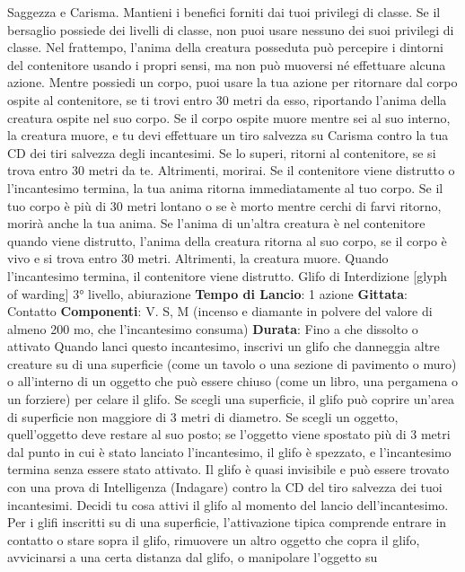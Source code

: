\begin{multicols}{2}
Saggezza e Carisma. Mantieni i benefici forniti dai tuoi
privilegi di classe. Se il bersaglio possiede dei livelli di
classe, non puoi usare nessuno dei suoi privilegi di
classe.
Nel frattempo, l’anima della creatura posseduta può
percepire i dintorni del contenitore usando i propri
sensi, ma non può muoversi né effettuare alcuna
azione.
Mentre possiedi un corpo, puoi usare la tua azione per
ritornare dal corpo ospite al contenitore, se ti trovi entro
30 metri da esso, riportando l’anima della creatura
ospite nel suo corpo. Se il corpo ospite muore mentre
sei al suo interno, la creatura muore, e tu devi effettuare
un tiro salvezza su Carisma contro la tua CD dei tiri
salvezza degli incantesimi. Se lo superi, ritorni al
contenitore, se si trova entro 30 metri da te. Altrimenti,
morirai.
Se il contenitore viene distrutto o l’incantesimo termina,
la tua anima ritorna immediatamente al tuo corpo. Se il
tuo corpo è più di 30 metri lontano o se è morto mentre
cerchi di farvi ritorno, morirà anche la tua anima. Se
l’anima di un’altra creatura è nel contenitore quando
viene distrutto, l’anima della creatura ritorna al suo
corpo, se il corpo è vivo e si trova entro 30 metri.
Altrimenti, la creatura muore.
Quando l’incantesimo termina, il contenitore viene
distrutto.
Glifo di Interdizione
[glyph of warding]
3° livello, abiurazione
\textbf{Tempo di Lancio}: 1 azione
\textbf{Gittata}: Contatto
\textbf{Componenti}: V. S, M (incenso e diamante in polvere
del valore di almeno 200 mo, che l’incantesimo
consuma)
\textbf{Durata}: Fino a che dissolto o attivato
Quando lanci questo incantesimo, inscrivi un glifo che
danneggia altre creature su di una superficie (come un
tavolo o una sezione di pavimento o muro) o all’interno
di un oggetto che può essere chiuso (come un libro,
una pergamena o un forziere) per celare il glifo. Se
scegli una superficie, il glifo può coprire un’area di
superficie non maggiore di 3 metri di diametro. Se
scegli un oggetto, quell’oggetto deve restare al suo
posto; se l’oggetto viene spostato più di 3 metri dal
punto in cui è stato lanciato l’incantesimo, il glifo è
spezzato, e l’incantesimo termina senza essere stato
attivato.
Il glifo è quasi invisibile e può essere trovato con una
prova di Intelligenza (Indagare) contro la CD del tiro
salvezza dei tuoi incantesimi.
Decidi tu cosa attivi il glifo al momento del lancio
dell’incantesimo.
Per i glifi inscritti su di una superficie, l’attivazione tipica
comprende entrare in contatto o stare sopra il glifo,
rimuovere un altro oggetto che copra il glifo, avvicinarsi
a una certa distanza dal glifo, o manipolare l’oggetto su

\end{multicols}
